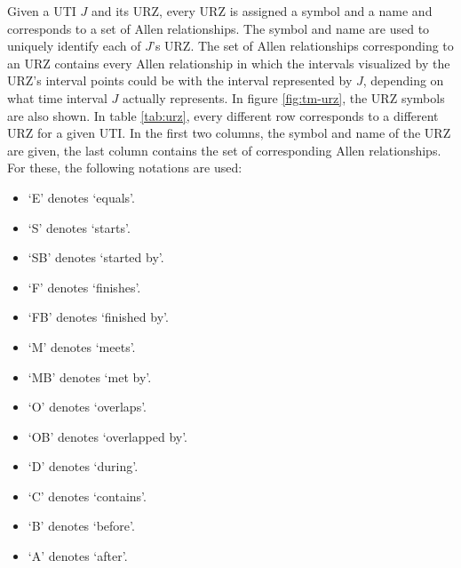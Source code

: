 Given a UTI $J$ and its URZ, every URZ is assigned a symbol and a name and corresponds to a set of Allen relationships. The symbol and name are used to uniquely identify each of $J$'s URZ. The set of Allen relationships corresponding to an URZ contains every Allen relationship in which the intervals visualized by the URZ's interval points could be with the interval represented by $J$, depending on what time interval $J$ actually represents. In figure \ref{fig:tm-urz}, the URZ symbols are also shown. In table \ref{tab:urz}, every different row corresponds to a different URZ for a given UTI. In the first two columns, the symbol and name of the URZ are given, the last column contains the set of corresponding Allen relationships. For these, the following notations are used:

\begin{itemize}
	\item `E' denotes `equals'.
	\item `S' denotes `starts'.
	\item `SB' denotes `started by'.
	\item `F' denotes `finishes'.
	\item `FB' denotes `finished by'.
	\item `M' denotes `meets'.
	\item `MB' denotes `met by'.
	\item `O' denotes `overlaps'.
	\item `OB' denotes `overlapped by'.
	\item `D' denotes `during'.
	\item `C' denotes `contains'.
	\item `B' denotes `before'.
	\item `A' denotes `after'.
\end{itemize}

